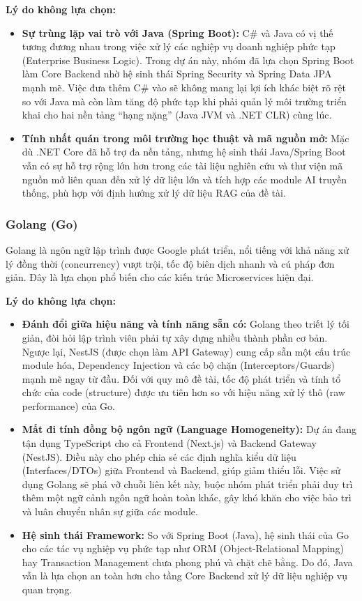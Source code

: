 \documentclass[12pt,a4paper]{report}
\begin{document}
\textbf{Lý do không lựa chọn:}
\begin{itemize}
    \item \textbf{Sự trùng lặp vai trò với Java (Spring Boot):} C\# và Java có vị thế tương đương nhau trong việc xử lý các nghiệp vụ doanh nghiệp phức tạp (Enterprise Business Logic). Trong dự án này, nhóm đã lựa chọn Spring Boot làm Core Backend nhờ hệ sinh thái Spring Security và Spring Data JPA mạnh mẽ. Việc đưa thêm C\# vào sẽ không mang lại lợi ích khác biệt rõ rệt so với Java mà còn làm tăng độ phức tạp khi phải quản lý môi trường triển khai cho hai nền tảng ``hạng nặng'' (Java JVM và .NET CLR) cùng lúc.
    \item \textbf{Tính nhất quán trong môi trường học thuật và mã nguồn mở:} Mặc dù .NET Core đã hỗ trợ đa nền tảng, nhưng hệ sinh thái Java/Spring Boot vẫn có sự hỗ trợ rộng lớn hơn trong các tài liệu nghiên cứu và thư viện mã nguồn mở liên quan đến xử lý dữ liệu lớn và tích hợp các module AI truyền thống, phù hợp với định hướng xử lý dữ liệu RAG của đề tài.
\end{itemize}

\subsubsection{Golang (Go)}
Golang là ngôn ngữ lập trình được Google phát triển, nổi tiếng với khả năng xử lý đồng thời (concurrency) vượt trội, tốc độ biên dịch nhanh và cú pháp đơn giản. Đây là lựa chọn phổ biến cho các kiến trúc Microservices hiện đại.

\textbf{Lý do không lựa chọn:}
\begin{itemize}
    \item \textbf{Đánh đổi giữa hiệu năng và tính năng sẵn có:} Golang theo triết lý tối giản, đòi hỏi lập trình viên phải tự xây dựng nhiều thành phần cơ bản. Ngược lại, NestJS (được chọn làm API Gateway) cung cấp sẵn một cấu trúc module hóa, Dependency Injection và các bộ chặn (Interceptors/Guards) mạnh mẽ ngay từ đầu. Đối với quy mô đề tài, tốc độ phát triển và tính tổ chức của code (structure) được ưu tiên hơn so với hiệu năng xử lý thô (raw performance) của Go.
    \item \textbf{Mất đi tính đồng bộ ngôn ngữ (Language Homogeneity):} Dự án đang tận dụng TypeScript cho cả Frontend (Next.js) và Backend Gateway (NestJS). Điều này cho phép chia sẻ các định nghĩa kiểu dữ liệu (Interfaces/DTOs) giữa Frontend và Backend, giúp giảm thiểu lỗi. Việc sử dụng Golang sẽ phá vỡ chuỗi liên kết này, buộc nhóm phát triển phải duy trì thêm một ngữ cảnh ngôn ngữ hoàn toàn khác, gây khó khăn cho việc bảo trì và luân chuyển nhân sự giữa các module.
    \item \textbf{Hệ sinh thái Framework:} So với Spring Boot (Java), hệ sinh thái của Go cho các tác vụ nghiệp vụ phức tạp như ORM (Object-Relational Mapping) hay Transaction Management chưa phong phú và chặt chẽ bằng. Do đó, Java vẫn là lựa chọn an toàn hơn cho tầng Core Backend xử lý dữ liệu nghiệp vụ quan trọng.
\end{itemize}
\end{document}
